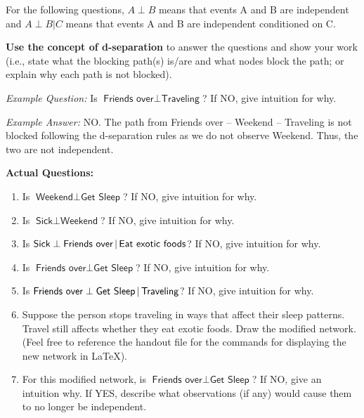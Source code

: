 \documentclass[submit]{harvardml}
\newcommand{\attr}[1]{\textsf{#1}}
\begin{document}
\begin{problem}
\medskip

For the following questions, $A \perp B$ means that events A and B are
independent and $A \perp B | C$ means that events A and B are independent
conditioned on C.

\textbf{Use the concept of d-separation} to answer the
questions and show your work (i.e., state what the blocking path(s) is/are and what nodes block the path; or explain why each path is not blocked).

\textit{Example Question:} Is $\attr{Friends over} \perp \attr{Traveling}$? If NO, give intuition for why.

\textit{Example Answer:} NO. The path from Friends over -- Weekend -- Traveling is not blocked following the d-separation rules as we do not observe Weekend. Thus, the two are not independent. 

\textbf{Actual Questions:}

\begin{enumerate}
\item Is $\attr{Weekend} \perp \attr{Get Sleep}$?
  If NO, give intuition for why.

\item Is $\attr{Sick} \perp \attr{Weekend}$?
  If NO, give intuition for why.


\item Is $\attr{Sick} \perp \attr{Friends over}\given \attr{Eat exotic
  foods}$? If NO, give intuition for why.


\item Is $\attr{Friends over} \perp \attr{Get Sleep}$? If NO, give
  intuition for why.

\item Is $\attr{Friends over} \perp \attr{Get Sleep} \given
  \attr{Traveling}$? If NO, give intuition for why.

\item Suppose the person stops traveling in ways that affect their
  sleep patterns.  Travel still
  affects whether they eat exotic foods.  Draw the modified network. (Feel free to reference the handout file for the commands for displaying the new network in \LaTeX).

\item For this modified network, is $\attr{Friends over} \perp
  \attr{Get Sleep}$? If NO, give an intuition why.  If YES,
  describe what observations (if any) would cause them to no longer be
  independent.

\end{enumerate}
\end{problem}
\end{document}

